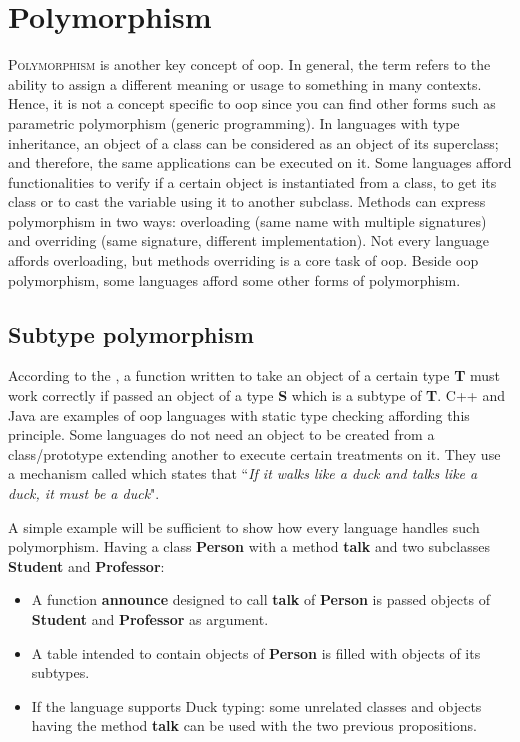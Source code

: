 \documentclass{KodeBook}
\begin{document}
\fi

\chapter{Polymorphism}

\begin{introduction}
	\lettrine{P}{olymorphism} is another key concept of \ac{oop}. 
	In general, the term refers to the ability to assign a different meaning or usage to something in many contexts.
	Hence, it is not a concept specific to \ac{oop} since you can find other forms such as parametric polymorphism (generic programming). 
	In languages with type inheritance, an object of a class can be considered as an object of its superclass; and therefore, the same applications can be executed on it.
	Some languages afford functionalities to verify if a certain object is instantiated from a class, to get its class or to cast the variable using it to another subclass.
	Methods can express polymorphism in two ways: overloading (same name with multiple signatures) and overriding (same signature, different implementation). 
	Not every language affords overloading, but methods overriding is a core task of \ac{oop}.
	Beside \ac{oop} polymorphism, some languages afford some other forms of polymorphism.
\end{introduction} 

\section{Subtype polymorphism}

According to the  \citep{1987-liskov}, a function written to take an object of a certain type \textbf{T} must work correctly if passed an object of a type \textbf{S} which is a subtype of \textbf{T}.
C++ and Java are examples of \ac{oop} languages with static type checking affording this principle. 
Some languages do not need an object to be created from a class/prototype extending another to execute certain treatments on it. 
They use a mechanism called  which states that ``\textit{If it walks like a duck and talks like a duck, it must be a duck}". 

A simple example will be sufficient to show how every language handles such polymorphism. 
Having a class \textbf{Person} with a method \textbf{talk} and two subclasses \textbf{Student} and \textbf{Professor}:
\begin{itemize}
	\item A function \textbf{announce} designed to call \textbf{talk} of \textbf{Person} is passed objects of \textbf{Student} and \textbf{Professor} as argument.
	\item A table intended to contain objects of \textbf{Person} is filled with objects of its subtypes.
	\item If the language supports Duck typing: some unrelated classes and objects having the method \textbf{talk} can be used with the two previous propositions.
\end{itemize}
\end{document}
